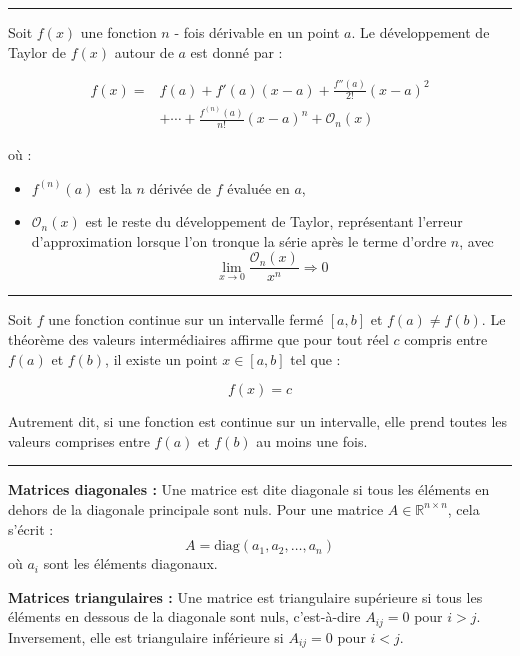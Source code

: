 \hrule
\begin{f}
 
Soit \( f(x) \) une fonction \( n \) - fois dérivable en un point \( a \). Le développement de Taylor de \( f(x) \) autour de \( a \) est donné par :

\begin{align*}
 f(x) =& f(a) + f'(a)(x - a) + \frac{f''(a)}{2!}(x - a)^2 \\
 &+ \cdots + \frac{f^{(n)}(a)}{n!}(x - a)^n + \mathcal{O}_n(x)
\end{align*}


où :
\begin{itemize}
    \item \( f^{(n)}(a) \) est la \( n \) dérivée de \( f \) évaluée en \( a \),
    \item \( \mathcal{O}_n(x) \) est le reste du développement de Taylor, représentant l'erreur d'approximation lorsque l'on tronque la série après le terme d'ordre \( n \), avec 
    \[
    \lim_{x\rightarrow 0}\frac{\mathcal{O}_n(x) }{x^n}\Rightarrow 0
    \]
\end{itemize}
\end{f}
\hrule
\begin{f} 

Soit \( f \) une fonction continue sur un intervalle fermé \([a, b]\) et \( f(a) \neq f(b) \). Le théorème des valeurs intermédiaires affirme que pour tout réel \( c \) compris entre \( f(a) \) et \( f(b) \), il existe un point \( x \in [a, b] \) tel que :

\[
f(x) = c
\]

Autrement dit, si une fonction est continue sur un intervalle, elle prend toutes les valeurs comprises entre \( f(a) \) et \( f(b) \) au moins une fois.
\end{f}
\hrule
\begin{f}
  
\textbf{Matrices diagonales :}
Une matrice est dite diagonale si tous les éléments en dehors de la diagonale principale sont nuls. Pour une matrice \( A \in \mathbb{R}^{n \times n} \), cela s'écrit :
\[
A = \text{diag}(a_1, a_2, \dots, a_n)
\]
où \( a_i \) sont les éléments diagonaux.

\textbf{Matrices triangulaires :}
Une matrice est triangulaire supérieure si tous les éléments en dessous de la diagonale sont nuls, c'est-à-dire \( A_{ij} = 0 \) pour \( i > j \). Inversement, elle est triangulaire inférieure si \( A_{ij} = 0 \) pour \( i < j \).
\end{f}
